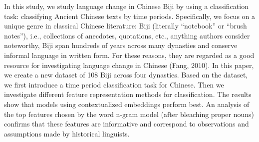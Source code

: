 In this study, we study language change in Chinese Biji by using a classification task: classifying Ancient Chinese texts by time periods. Specifically, we focus on a unique genre in classical Chinese literature: Biji (literally ``notebook'' or ``brush notes''), i.e., collections of anecdotes, quotations, etc., anything authors consider noteworthy, Biji span hundreds of years across many dynasties and conserve informal language in written form. For these reasons, they are regarded as a good resource for investigating language change in Chinese (Fang, 2010). In this paper, we create a new dataset of 108 Biji across four dynasties. Based on the dataset, we first introduce a time period classification task for Chinese. Then we investigate different feature representation methods for classification. The results show that models using contextualized embeddings perform best. An analysis of the top features chosen by the word n-gram model (after bleaching proper nouns) confirms that these features are informative and correspond to observations and assumptions made by historical linguists.
